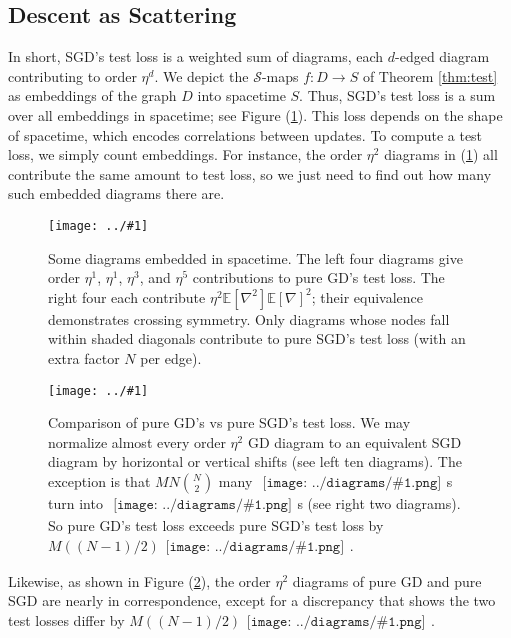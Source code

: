 \documentclass{article}
\newcommand{\Ss}{\mathcal{S}}
\newcommand{\expct}[1]{\mathbb{E}\left[#1\right]}
\newcommand{\plotmoo}[3]{
    \texttt{[image: ../\#1]}
}
\newcommand{\sdia}[1]{\begin{gathered}\texttt{[image: ../diagrams/\#1.png]}\end{gathered}}
\begin{document}
    \subsection{Descent as Scattering}
        In short, SGD's test loss is a weighted sum of diagrams, each $d$-edged
        diagram contributing to order $\eta^d$.  We depict the $\Ss$-maps 
        $f:D\to S$ of Theorem \ref{thm:test} as embeddings of the graph $D$
        into spacetime $S$.  Thus, SGD's test loss is a sum over all embeddings
        in spacetime; see Figure (\ref{fig:spacetime}).  This loss depends on
        the shape of spacetime, which encodes correlations between updates.  To
        compute a test loss, we simply count embeddings.  For instance, the
        order $\eta^2$ diagrams in (\ref{fig:spacetime}) all contribute the
        same amount to test loss, so we just need to find out how many such
        embedded diagrams there are.   
        \begin{figure}[h!] 
            \centering  
            \plotmoo{diagrams/spacetime}{\columnwidth}{3.0cm}  
            \caption{
                Some diagrams embedded in spacetime.  The left four diagrams
                give order $\eta^1$, $\eta^1$, $\eta^3$, and $\eta^5$
                contributions to pure GD's test loss.  The right four each
                contribute $\eta^2 \expct{\nabla^2} \expct{\nabla}^2$; their
                equivalence demonstrates crossing symmetry.  Only diagrams
                whose nodes fall within shaded diagonals contribute to pure SGD's
                test loss (with an extra factor $N$ per edge). 
            }
            \label{fig:spacetime}
        \end{figure}
        \begin{figure}[h!] 
            \centering  
            \plotmoo{diagrams/spacetime-b}{\columnwidth}{3.0cm}
            \caption{
                Comparison of pure GD's vs pure SGD's test loss.  We may
                normalize almost every order $\eta^2$ GD diagram to an
                equivalent SGD diagram by horizontal or vertical shifts (see
                left ten diagrams).  The exception is that $MN{N\choose 2}$ many
                $\sdia{(01-2)(01-12)}$s turn into $\sdia{(0-1-2)(01-12)}$s (see
                right two diagrams).  So pure GD's test loss exceeds pure SGD's
                test loss by $M ((N-1)/2) \sdia{c(01-2)(01-12)}$.
            }
            \label{fig:vsmulti}
        \end{figure}
        Likewise, as shown in Figure (\ref{fig:vsmulti}), the order $\eta^2$
        diagrams of pure GD and pure SGD are nearly in correspondence, except
        for a discrepancy that shows the two test losses differ by $M ((N-1)/2)
        \sdia{c(01-2)(01-12)}$.
    
\end{document}
